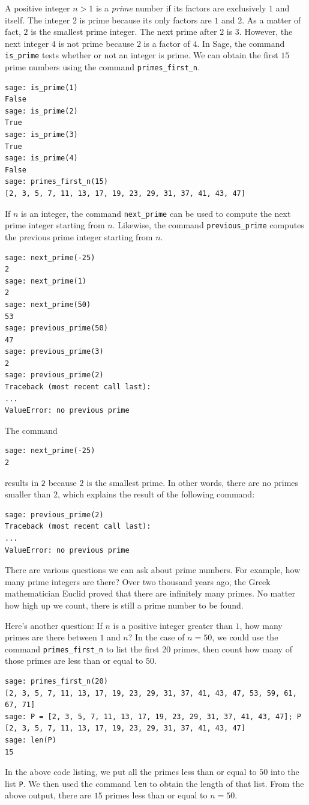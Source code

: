 A positive integer $n > 1$ is a \emph{prime} number if
its factors are exclusively $1$ and itself. The integer $2$ is prime
because its only factors are $1$ and $2$. As a matter of fact, $2$ is
the smallest prime integer. The next prime after $2$ is $3$. However,
the next integer $4$ is not prime because $2$ is a factor of $4$. In
Sage, the command \verb!is_prime! tests whether or not an integer is
prime. We can obtain the first $15$ prime numbers using the command
\verb!primes_first_n!.

\begin{lstlisting}
sage: is_prime(1)
False
sage: is_prime(2)
True
sage: is_prime(3)
True
sage: is_prime(4)
False
sage: primes_first_n(15)
[2, 3, 5, 7, 11, 13, 17, 19, 23, 29, 31, 37, 41, 43, 47]
\end{lstlisting}

If $n$ is an integer, the command \verb!next_prime! can be used to
compute the next prime integer starting from $n$. Likewise, the command
\verb!previous_prime! computes the previous prime integer starting
from $n$.
%
\begin{lstlisting}
sage: next_prime(-25)
2
sage: next_prime(1)
2
sage: next_prime(50)
53
sage: previous_prime(50)
47
sage: previous_prime(3)
2
sage: previous_prime(2)
Traceback (most recent call last):
...
ValueError: no previous prime
\end{lstlisting}
%
The command
%
\begin{lstlisting}
sage: next_prime(-25)
2
\end{lstlisting}
%
results in \verb!2! because $2$ is the smallest prime. In other words,
there are no primes smaller than $2$, which explains the result of the
following command:
%
\begin{lstlisting}
sage: previous_prime(2)
Traceback (most recent call last):
...
ValueError: no previous prime
\end{lstlisting}

There are various questions we can ask about prime
numbers. For example, how many prime integers are there? Over two
thousand years ago, the Greek mathematician Euclid
proved that there are infinitely many primes. No matter how high up we
count, there is still a prime number to be found.

Here's another question: If $n$ is a positive integer greater than
$1$, how many primes are there between $1$ and $n$? In the case of
$n = 50$, we could use the command \verb!primes_first_n! to list the
first 20 primes, then count how many of those primes are less than or
equal to $50$.
%
\begin{lstlisting}
sage: primes_first_n(20)
[2, 3, 5, 7, 11, 13, 17, 19, 23, 29, 31, 37, 41, 43, 47, 53, 59, 61, 67, 71]
sage: P = [2, 3, 5, 7, 11, 13, 17, 19, 23, 29, 31, 37, 41, 43, 47]; P
[2, 3, 5, 7, 11, 13, 17, 19, 23, 29, 31, 37, 41, 43, 47]
sage: len(P)
15
\end{lstlisting}
%
In the above code listing, we put all the primes less than or equal to
$50$ into the list \verb!P!. We then used the command \verb!len! to
obtain the length of that list. From the above output, there are $15$
primes less than or equal to $n = 50$.

